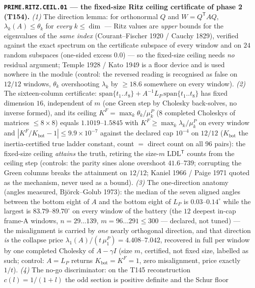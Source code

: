 \documentclass[11pt,a4paper]{article}
\begin{document}
\par\smallskip\noindent\textbf{\texttt{PRIME.RITZ.CEIL.01} --- the
fixed-size Ritz ceiling certificate of phase 2 (T154).}
\emph{(1)} The direction lemma: for orthonormal $Q$ and
$W=Q^{\mathsf T}AQ$, $\lambda_k(A)\le\theta_k$ for \emph{every}
$k\le\dim$ --- Ritz values are \emph{upper} bounds for the eigenvalues of
the \emph{same index} (Courant--Fischer 1920 / Cauchy 1829), verified
against the exact spectrum on the certificate subspace of every window
and on $24$ random subspaces (one-sided excess $0.0$) --- so the
fixed-size ceiling needs \emph{no} residual argument; Temple 1928 / Kato
1949 is a floor device and is used nowhere in the module (control: the
reversed reading is recognised as false on $12/12$ windows, $\theta_k$
overshooting $\lambda_k$ by $\ge18.6$ somewhere on every window).
\emph{(2)} The sixteen-column certificate:
$\mathrm{span}\{t_1..t_8\}+A^{-1}L_P\,\mathrm{span}\{t_1..t_8\}$ has
fixed dimension $16$, independent of $m$ (one Green step by Cholesky
back-solves, no inverse formed), and its ceiling
$K^F=\max_k\theta_k/\mu^P_k$ ($8$ completed Choleskys of matrices
$\le8\times8$) equals $1.1019$--$1.5845$ with
$K^F\ge\max_k\lambda_k/\mu^P_k$ on every window and
$|K^F/K_{\mathrm{bot}}-1|\le9.9\times10^{-7}$ against the declared cap
$10^{-4}$ on $12/12$ ($K_{\mathrm{bot}}$ the inertia-certified true
ladder constant, count $=$ direct count on all $96$ pairs): the
fixed-size ceiling \emph{attains} the truth, retiring the size-$m$
LDL$^{\mathsf T}$ counts from the ceiling step (controls: the parity
sines alone overshoot $41.6$--$739$; corrupting the Green columns breaks
the attainment on $12/12$; Kaniel 1966 / Paige 1971 quoted as the
mechanism, never used as a bound). \emph{(3)} The one-direction anatomy
(angles measured, Bj\"orck--Golub 1973): the median of the seven aligned
angles between the bottom eight of $A$ and the bottom eight of $L_P$ is
$0.03$--$0.14^\circ$ while the largest is $83.79$--$89.70^\circ$ on every
window of the battery (the $12$ deepest in-cap frame-A windows,
$n=29\ldots139$, $m=96\ldots291\le300$ --- declared, not tuned) --- the
misalignment is carried by \emph{one} nearly orthogonal direction, and
that direction \emph{is} the collapse price
$\lambda_1(A)/(t\,\mu^P_1)=4.408$--$7.042$, recovered in full per window
by one completed Cholesky of $A-\gamma I$ (size $m$, certified, not
fixed size, labelled as such; control: $A=L_P$ returns
$K_{\mathrm{bot}}=K^F=1$, zero misalignment, price exactly $1/t$).
\emph{(4)} The no-go discriminator: on the T145 reconstruction
$c(l)=1/(1+l)$ the odd section is positive definite and the Schur floor
\end{document}
